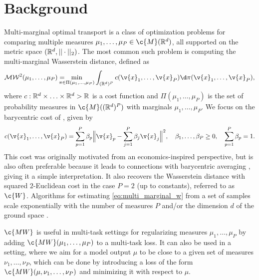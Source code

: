 \documentclass{article}
\begin{document}
\section{Background}
\label{sec:background}

Multi-marginal optimal transport \cite{gangbo} is a class of optimization problems for comparing multiple measures $\mu_1,\ldots,\mu_P \in \c{M}(\R^d)$, all supported on the metric space $(\mathbb{R}^d,  || \cdot||_2)$. 
The most common such problem is computing the multi-marginal Wasserstein distance, defined as
\[
\label{eq:multi_marginal_w}
\mathcal{MW}^2(\mu_1,\ldots,\mu_P)=\hspace{-4mm}\min_{\pi \in \Pi(\mu_1,\ldots, \mu_P)} \int_{(\R^d)^P}  c(\v{x}_1,\ldots,\v{x}_P) \d\pi(\v{x}_1,\ldots,\v{x}_P),
\]
where $c:\mathbb{R}^d \times\ldots\times \mathbb{R}^d \-> \mathbb{R}$ is a cost function and $\Pi(\mu_1,\ldots, \mu_P)$ is the set of probability measures in $\c{M}((\R^d)^P)$ with marginals $\mu_1, \ldots, \mu_P$.
We focus on the barycentric cost of \textcite{gangbo, journals/siamma/AguehC11}, given by
\[
c(\v{x}_1,\ldots,\v{x}_P) = \sum_{p=1}^P \beta_p \Big\Vert  \v{x}_p - \sum_{j=1}^P\beta_j\v{x}_j\Big\Vert ^2,
\quad\beta_1,\ldots,\beta_P \geq 0, \quad \sum_{p=1}^P \beta_p = 1
.
\]
This cost was originally motivated from an economics-inspired perspective, but is also often preferable because it leads to connections with barycentric averaging \cite{journals/siamma/AguehC11}, giving it a simple interpretation.
It also recovers the Wasserstein distance with squared $2$-Euclidean cost in the case $P=2$ (up to constants), referred to as $\c{W}$.
Algorithms for estimating \eqref{eq:multi_marginal_w} from a set of samples  scale exponentially with the number of measures $P$ and/or the dimension $d$ of the ground space  \cite{altschuler_mm, altschulernpbary, benamou:hal-01096124}.

$\c{MW}$ is useful in multi-task settings for regularizing measures $\mu_1,\ldots, \mu_P$ by adding $\c{MW}(\mu_1,\ldots, \mu_P)$ to a multi-task loss. 
It can also be used in a setting, where we aim for a model output $\mu$ to be close to a given set of measures $\nu_1,\ldots, \nu_P$, which can be done by introducing a loss of the form $\c{MW}(\mu, \nu_1,\ldots, \nu_P)$ and minimizing it with respect to $\mu$.


\end{document}
